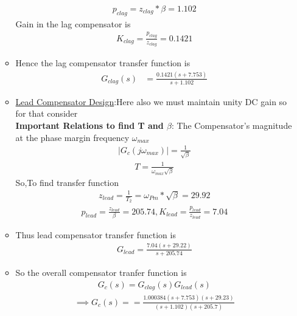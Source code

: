 \begin{enumerate}[label=\thesubsection.\arabic*.,ref=\thesubsection.\theenumi]
\begin{itemize}
\begin{align}
    p_{clag}=z_{clag}*\beta=1.102
\end{align}
Gain in the lag compensator is 
\begin{align}
    K_{clag} = \frac{p_{clag}}{z_{clag}}=0.1421
\end{align}
\item Hence the lag compensator transfer function is
\begin{align}
 G_{clag}(s) &= \frac{0.1421(s+7.753)}{s+1.102} 
\end{align}
\item \underline{Lead Compensator Design}:Here also we must maintain unity DC gain so for that consider\\
\textbf{Important Relations to find T and $\beta$}:
The Compensator's magnitude at the phase margin frequency $\omega_{max}$
\begin{align}
     |G_{c}(j\omega_{max})| = \frac{1}{\sqrt{\beta}} 
\end{align}
\begin{align}
    T = \frac{1}{\omega_{max}\sqrt{\beta}}
\end{align}
So,To find transfer function
\begin{align}
    z_{lead}=\frac{1}{T_{2}}=\omega_{Pm}*\sqrt{\beta}=29.92
\end{align}
\begin{align}
    p_{lead}=\frac{z_{lead}}{\beta}=205.74,K_{lead}=\frac{p_{lead}}{z_{lead}}=7.04
\end{align}
\item Thus lead compensator transfer function is 
\begin{align}
    G_{lead}= \frac{7.04(s+29.22)}{s+205.74} 
\end{align}
\item So the overall compensator tranfer function is
\begin{align}
    G_{c}(s) = G_{clag}(s)G_{lead}(s)
\end{align}
\begin{align}
\implies G_{c}(s)==\frac{1.000384(s+7.753)(s+29.23)}{(s+1.102)(s+205.7)}
\end{align}

\end{itemize}
\begin{itemize}
 

\end{itemize}
\end{enumerate}
